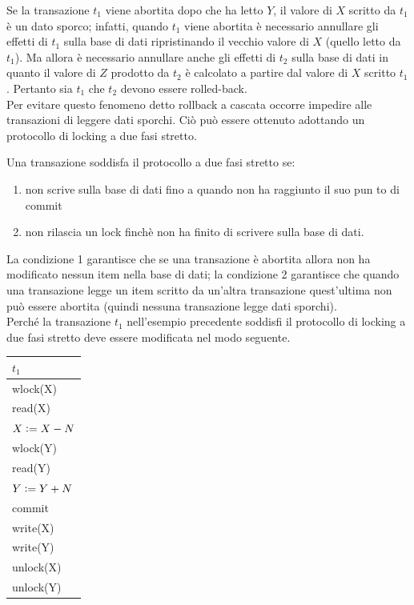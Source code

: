 Se la transazione $t_1$ viene abortita dopo che ha letto $Y$, il valore di $X$ scritto da $t_1$ è un dato
sporco; infatti, quando $t_1$ viene abortita è necessario annullare gli effetti di $t_1$ sulla base di dati
ripristinando il vecchio valore di $X$ (quello letto da $t_1$). Ma allora è necessario annullare anche gli
effetti di $t_2$ sulla base di dati in quanto il valore di $Z$ prodotto da $t_2$ è calcolato a partire dal valore
di $X$ scritto $t_1$. Pertanto sia $t_1$ che $t_2$ devono essere rolled-back.\\
Per evitare questo fenomeno detto rollback a cascata occorre impedire alle transazioni di leggere
dati sporchi. Ciò può essere ottenuto adottando un protocollo di locking a due fasi stretto.
\begin{defn}
 Una transazione soddisfa il protocollo a due fasi stretto se:
 \begin{enumerate}
  \item non scrive sulla base di dati fino a quando non ha raggiunto il suo pun to di commit
  \item non rilascia un lock finchè non ha finito di scrivere sulla base di dati.
 \end{enumerate}
\end{defn}

La condizione 1 garantisce che se una transazione è abortita allora non ha modificato nessun item
nella base di dati; la condizione 2 garantisce che quando una transazione legge un item scritto da
un'altra transazione quest'ultima non può essere abortita (quindi nessuna transazione legge dati
sporchi).\\
Perché la transazione $t_1$ nell'esempio precedente soddisfi il protocollo di locking a due fasi stretto
deve essere modificata nel modo seguente.

\begin{center}
 \begin{tabular}{|l|}
  \hline
  $t_1$\\
  \hline
wlock(X)\\
read(X)\\
$X\vcentcolon=X-N$\\
wlock(Y)\\
read(Y)\\
$Y\vcentcolon=Y+N$\\
commit\\
write(X)\\
write(Y)\\
unlock(X)\\
unlock(Y)\\
\hline
 \end{tabular}
\end{center}

